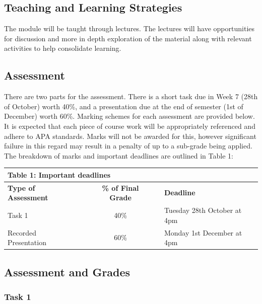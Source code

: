 \documentclass[
  x11names]{article}
\begin{document}
\subsection{Teaching and Learning
Strategies}\label{teaching-and-learning-strategies}

The module will be taught through lectures. The lectures will have
opportunities for discussion and more in depth exploration of the
material along with relevant activities to help consolidate learning.

\subsection{Assessment}\label{assessment}

There are two parts for the assessment. There is a short task due in
Week 7 (28th of October) worth 40\%, and a presentation due at the end
of semester (1st of December) worth 60\%. Marking schemes for each
assessment are provided below. It is expected that each piece of course
work will be appropriately referenced and adhere to APA standards. Marks
will not be awarded for this, however significant failure in this regard
may result in a penalty of up to a sub-grade being applied. The
breakdown of marks and important deadlines are outlined in Table 1:

\bigskip

\begin{tabular}{l >{\centering\arraybackslash}m{.5cm} c >{\centering\arraybackslash}m{.5cm} l}
  \multicolumn{5}{l}{\textbf{Table 1:} Important deadlines} \\
  \hline \hline
  \textbf{Type of Assessment}               & & \textbf{\% of Final Grade} & & \textbf{Deadline} \\ \hline
  Task 1                                   & & 40\%                       & & Tuesday 28th October at 4pm \\ \hline
  Recorded Presentation                                     & & 60\%                       & & Monday 1st December at 4pm \\ \hline \end{tabular}

\bigskip

\subsection{Assessment and Grades}\label{assessment-and-grades}

\subsubsection{Task 1}\label{task-1}
\end{document}
